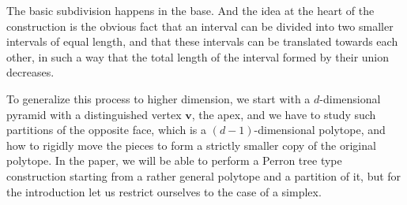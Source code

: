 \documentclass[10pt]{amsart}
\begin{document}
The basic subdivision happens in the base. And the idea at the heart of the construction is the obvious fact that an interval can be divided into two smaller intervals of equal length, and that these intervals can be translated towards each other, in such a way that the total length of the interval formed by their union decreases. 

To generalize this process to higher dimension, we start with a $d$-dimensional pyramid with a distinguished vertex $\mathbf{v}$, the apex, and we have to study such partitions of the opposite face, which is a $(d-1)$-dimensional polytope, and how to rigidly move the pieces to form a strictly smaller copy of the original polytope. In the paper, we will be able to perform a Perron tree type construction starting from a rather general polytope and a partition of it, but for the introduction let us restrict ourselves to the case of a simplex.
\end{document}
